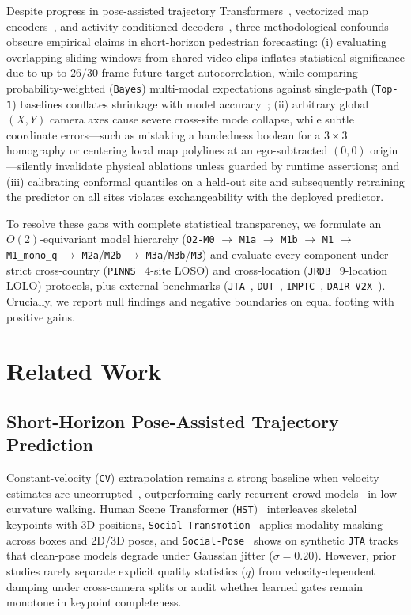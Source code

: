 \documentclass[journal]{IEEEtran}
\begin{document}
Despite progress in pose-assisted trajectory Transformers~\cite{salzmann2023hst,saadatnejad2024transmotion}, vectorized map encoders~\cite{gao2020vectornet,cheng2020mcenet}, and activity-conditioned decoders~\cite{kooij2019switching,liang2019next}, three methodological confounds obscure empirical claims in short-horizon pedestrian forecasting: (i) evaluating overlapping sliding windows from shared video clips inflates statistical significance due to up to $26/30$-frame future target autocorrelation, while comparing probability-weighted (\texttt{Bayes}) multi-modal expectations against single-path (\texttt{Top-1}) baselines conflates shrinkage with model accuracy~\cite{scholler2020cv}; (ii) arbitrary global $(X, Y)$ camera axes cause severe cross-site mode collapse, while subtle coordinate errors---such as mistaking a handedness boolean for a $3\times 3$ homography or centering local map polylines at an ego-subtracted $(0, 0)$ origin---silently invalidate physical ablations unless guarded by runtime assertions; and (iii) calibrating conformal quantiles on a held-out site and subsequently retraining the predictor on all sites violates exchangeability with the deployed predictor.

To resolve these gaps with complete statistical transparency, we formulate an $O(2)$-equivariant model hierarchy (\texttt{O2-M0} $\to$ \texttt{M1a} $\to$ \texttt{M1b} $\to$ \texttt{M1} $\to$ \texttt{M1\_mono\_q} $\to$ \texttt{M2a}/\texttt{M2b} $\to$ \texttt{M3a}/\texttt{M3b}/\texttt{M3}) and evaluate every component under strict cross-country (\texttt{PINNS}~\cite{peng2026pinns} 4-site LOSO) and cross-location (\texttt{JRDB}~\cite{martin2023jrdb} 9-location LOLO) protocols, plus external benchmarks (\texttt{JTA}~\cite{fabbri2018jta}, \texttt{DUT}~\cite{yang2019dut}, \texttt{IMPTC}~\cite{hetzel2023imptc}, \texttt{DAIR-V2X}~\cite{yu2022dair}). Crucially, we report null findings and negative boundaries on equal footing with positive gains.

\section{Related Work}
\subsection{Short-Horizon Pose-Assisted Trajectory Prediction}
Constant-velocity (\texttt{CV}) extrapolation remains a strong baseline when velocity estimates are uncorrupted~\cite{scholler2020cv}, outperforming early recurrent crowd models~\cite{salzmann2020trajectron} in low-curvature walking. Human Scene Transformer (\texttt{HST})~\cite{salzmann2023hst} interleaves skeletal keypoints with 3D positions, \texttt{Social-Transmotion}~\cite{saadatnejad2024transmotion} applies modality masking across boxes and 2D/3D poses, and \texttt{Social-Pose}~\cite{gao2025socialpose} shows on synthetic \texttt{JTA} tracks that clean-pose models degrade under Gaussian jitter ($\sigma = 0.20$). However, prior studies rarely separate explicit quality statistics ($q$) from velocity-dependent damping under cross-camera splits or audit whether learned gates remain monotone in keypoint completeness.
\end{document}
